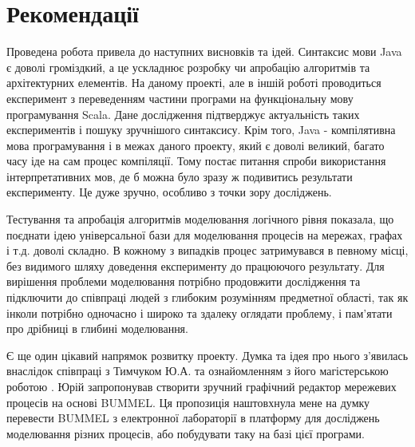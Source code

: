 \documentclass[12pt,a4paper]{article}
\begin{document}
\clearpage

\section{Рекомендації}

Проведена робота привела до наступних висновків та ідей. Синтаксис мови Java є доволі громіздкий, а це ускладнює розробку чи апробацію алгоритмів та архітектурних елементів. На даному проекті, але в іншій роботі проводиться експеримент з переведенням частини програми на функціональну мову програмування Scala. Дане дослідження підтверджує актуальність таких експериментів і пошуку зручнішого синтаксису. Крім того, Java - компілятивна мова програмування і в межах даного проекту, який є доволі великий, багато часу іде на сам процес компіляції. Тому постає питання спроби використання інтерпретативних мов, де б можна було зразу ж подивитись результати експерименту. Це дуже зручно, особливо з точки зору досліджень.

Тестування та апробація алгоритмів моделювання логічного рівня показала, що поєднати ідею універсальної бази для моделювання процесів на мережах, графах і т.д. доволі складно. В кожному з випадків процес затримувався в певному місці, без видимого шляху доведення експерименту до працюючого результату. Для вирішення проблеми моделювання потрібно продовжити дослідження та підключити до співпраці людей з глибоким розумінням предметної області, так як інколи потрібно одночасно і широко та здалеку оглядати проблему, і пам’ятати про дрібниці в глибині моделювання.

Є ще один цікавий напрямок розвитку проекту. Думка та ідея про нього з’явилась внаслідок співпраці з Тимчуком Ю.А. та ознайомленням з його магістерською роботою \cite{thesis-Tymchuk}. Юрій запропонував створити зручний графічний редактор мережевих процесів на основі BUMMEL. Ця пропозиція наштовхнула мене на думку перевести BUMMEL з електронної лабораторії в платформу для досліджень моделювання різних процесів, або побудувати таку на базі цієї програми.

\clearpage
\end{document}
